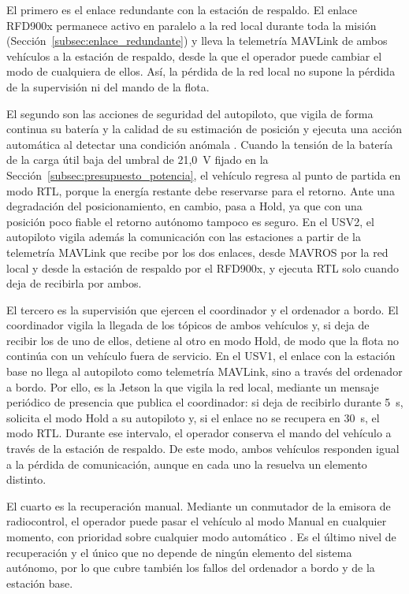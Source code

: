 El primero es el enlace redundante con la estación de respaldo. El enlace RFD900x permanece activo en paralelo a la red local durante toda la misión (Sección~\ref{subsec:enlace_redundante}) y lleva la telemetría MAVLink de ambos vehículos a la estación de respaldo, desde la que el operador puede cambiar el modo de cualquiera de ellos. Así, la pérdida de la red local no supone la pérdida de la supervisión ni del mando de la flota. %

El segundo son las acciones de seguridad del autopiloto, que vigila de forma continua su batería y la calidad de su estimación de posición y ejecuta una acción automática al detectar una condición anómala \cite{kumar2025} \cite{aliane2026}. Cuando la tensión de la batería de la carga útil baja del umbral de 21,0~V fijado en la Sección~\ref{subsec:presupuesto_potencia}, el vehículo regresa al punto de partida en modo RTL, porque la energía restante debe reservarse para el retorno. Ante una degradación del posicionamiento, en cambio, pasa a Hold, ya que con una posición poco fiable el retorno autónomo tampoco es seguro. En el USV2, el autopiloto vigila además la comunicación con las estaciones a partir de la telemetría MAVLink que recibe por los dos enlaces, desde MAVROS por la red local y desde la estación de respaldo por el RFD900x, y ejecuta RTL solo cuando deja de recibirla por ambos. %

El tercero es la supervisión que ejercen el coordinador y el ordenador a bordo. El coordinador vigila la llegada de los tópicos de ambos vehículos y, si deja de recibir los de uno de ellos, detiene al otro en modo Hold, de modo que la flota no continúa con un vehículo fuera de servicio. En el USV1, el enlace con la estación base no llega al autopiloto como telemetría MAVLink, sino a través del ordenador a bordo. Por ello, es la Jetson la que vigila la red local, mediante un mensaje periódico de presencia que publica el coordinador: si deja de recibirlo durante 5~s, solicita el modo Hold a su autopiloto y, si el enlace no se recupera en 30~s, el modo RTL. Durante ese intervalo, el operador conserva el mando del vehículo a través de la estación de respaldo. De este modo, ambos vehículos responden igual a la pérdida de comunicación, aunque en cada uno la resuelva un elemento distinto.

El cuarto es la recuperación manual. Mediante un conmutador de la emisora de radiocontrol, el operador puede pasar el vehículo al modo Manual en cualquier momento, con prioridad sobre cualquier modo automático \cite{iniesta2025}. Es el último nivel de recuperación y el único que no depende de ningún elemento del sistema autónomo, por lo que cubre también los fallos del ordenador a bordo y de la estación base.

